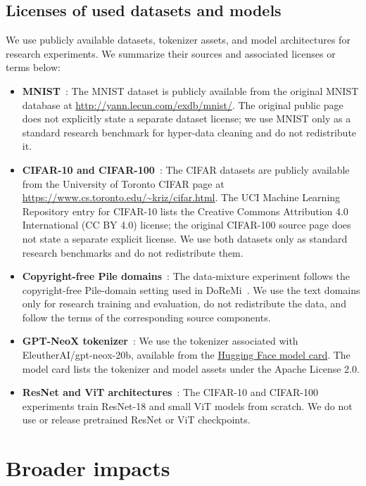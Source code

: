 \documentclass{pkumelon}
\theoremstyle{plain}
\begin{document}
\subsection{Licenses of used datasets and models}
\label{subsec:asset_licenses}

We use publicly available datasets, tokenizer assets, and model architectures for research experiments. We summarize their sources and associated licenses or terms below:
\begin{itemize}
    \item \textbf{MNIST}~\citep{lecun2010mnist}: The MNIST dataset is publicly available from the original MNIST database at \url{http://yann.lecun.com/exdb/mnist/}. The original public page does not explicitly state a separate dataset license; we use MNIST only as a standard research benchmark for hyper-data cleaning and do not redistribute it.
    \item \textbf{CIFAR-10 and CIFAR-100}~\citep{krizhevsky2009learning}: The CIFAR datasets are publicly available from the University of Toronto CIFAR page at \url{https://www.cs.toronto.edu/~kriz/cifar.html}. The UCI Machine Learning Repository entry for CIFAR-10 lists the Creative Commons Attribution 4.0 International (CC BY 4.0) license; the original CIFAR-100 source page does not state a separate explicit license. We use both datasets only as standard research benchmarks and do not redistribute them.
    \item \textbf{Copyright-free Pile domains}~\citep{gao2020pile}: The data-mixture experiment follows the copyright-free Pile-domain setting used in DoReMi~\citep{xie2023doremi}. We use the text domains only for research training and evaluation, do not redistribute the data, and follow the terms of the corresponding source components.
    \item \textbf{GPT-NeoX tokenizer}~\citep{black2022gpt}: We use the tokenizer associated with EleutherAI/gpt-neox-20b, available from the \href{https://huggingface.co/EleutherAI/gpt-neox-20b}{Hugging Face model card}. The model card lists the tokenizer and model assets under the Apache License 2.0.
    \item \textbf{ResNet and ViT architectures}~\citep{he2016deep,dosovitskiy2020image}: The CIFAR-10 and CIFAR-100 experiments train ResNet-18 and small ViT models from scratch. We do not use or release pretrained ResNet or ViT checkpoints.
\end{itemize}

\section{Broader impacts}
\label{app:broader_impacts}
\end{document}
